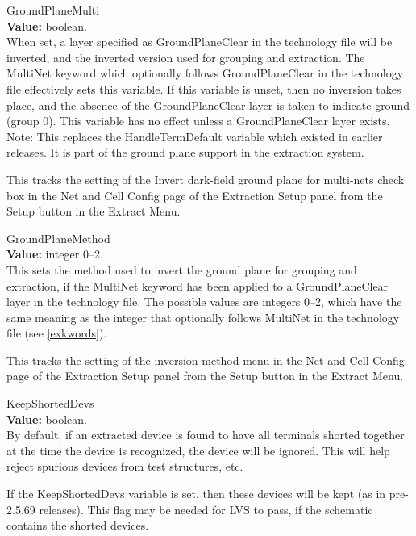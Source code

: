 \begin{description}
\item{\et GroundPlaneMulti}\\
{\bf Value:} boolean.\\
When set, a layer specified as {\et GroundPlaneClear} in the
technology file will be inverted, and the inverted version used for
grouping and extraction.  The {\et MultiNet} keyword which optionally
follows {\et GroundPlaneClear} in the technology file effectively sets
this variable.  If this variable is unset, then no inversion takes
place, and the absence of the {\et GroundPlaneClear} layer is taken to
indicate ground (group 0).  This variable has no effect unless a {\et
GroundPlaneClear} layer exists.\\ {\kb Note}:  This replaces the {\vt
HandleTermDefault} variable which existed in earlier {\Xic} releases. 
It is part of the ground plane support in the extraction system.

This tracks the setting of the {\cb Invert dark-field ground plane for
multi-nets} check box in the {\cb Net and Cell Config} page of the
{\cb Extraction Setup} panel from the {\cb Setup} button in the {\cb
Extract Menu}.

\item{\et GroundPlaneMethod}\\
{\bf Value:} integer 0--2.\\
This sets the method used to invert the ground plane for grouping and
extraction, if the {\et MultiNet} keyword has been applied to a {\et
GroundPlaneClear} layer in the technology file.  The possible values
are integers 0--2, which have the same meaning as the integer that
optionally follows {\et MultiNet} in the technology file (see
\ref{exkwords}).

This tracks the setting of the inversion method menu in the {\cb Net
and Cell Config} page of the {\cb Extraction Setup} panel from the
{\cb Setup} button in the {\cb Extract Menu}.

\item{\et KeepShortedDevs}\\
{\bf Value:} boolean.\\
By default, if an extracted device is found to have all terminals
shorted together at the time the device is recognized, the device will
be ignored.  This will help reject spurious devices from test
structures, etc.

If the {\et KeepShortedDevs} variable is set, then these devices will
be kept (as in pre-2.5.69 releases).  This flag may be needed for LVS
to pass, if the schematic contains the shorted devices.


\end{description}
